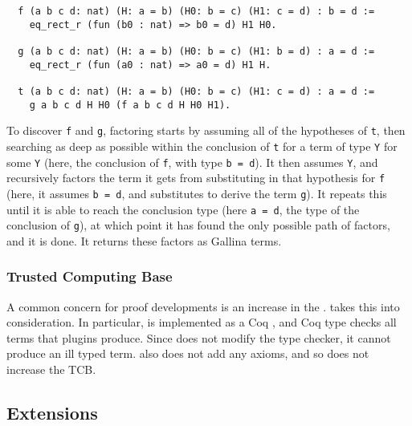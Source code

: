 \begin{lstlisting}
  f (a b c d: nat) (H: a = b) (H0: b = c) (H1: c = d) : b = d :=
    eq_rect_r (fun (b0 : nat) => b0 = d) H1 H0.

  g (a b c d: nat) (H: a = b) (H0: b = c) (H1: b = d) : a = d :=
    eq_rect_r (fun (a0 : nat) => a0 = d) H1 H.

  t (a b c d: nat) (H: a = b) (H0: b = c) (H1: c = d) : a = d :=
    g a b c d H H0 (f a b c d H H0 H1).
\end{lstlisting}
To discover \lstinline{f} and \lstinline{g},
factoring starts by assuming all of the hypotheses of \lstinline{t},
then searching as deep as possible within the conclusion of \lstinline{t} for a term
of type \lstinline{Y} for some \lstinline{Y} (here, the conclusion of \lstinline{f}, with type \lstinline{b = d}).
It then assumes \lstinline{Y}, and recursively factors the term
it gets from substituting in that hypothesis for \lstinline{f} (here, it assumes \lstinline{b = d}, and substitutes to derive the term \lstinline{g}).
It repeats this until it is able to reach the conclusion type (here \lstinline{a = d}, the type of the conclusion of \lstinline{g}),
at which point it has found the only possible path of factors, and it is done.
It returns these factors as Gallina terms.

\subsubsection{Trusted Computing Base}
\label{sec:tcb}

A common concern for proof developments is an increase in the .
\sysname takes this into consideration.
In particular, \sysname is implemented as a Coq ,
and Coq type checks all terms that plugins produce.
Since \sysname does not modify the type checker, it cannot produce an ill typed term.
\sysname also does not add any axioms,
and so does not increase the TCB. %

\subsection{Extensions}
\label{sec:workflow}


